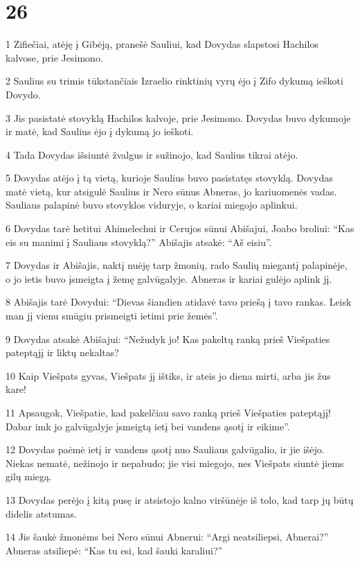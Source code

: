 \chapter{26}

\par 1 Zifiečiai, atėję į Gibėją, pranešė Sauliui, kad Dovydas slapstosi Hachilos kalvose, prie Jesimono. 
\par 2 Saulius su trimis tūkstančiais Izraelio rinktinių vyrų ėjo į Zifo dykumą ieškoti Dovydo. 
\par 3 Jis pasistatė stovyklą Hachilos kalvoje, prie Jesimono. Dovydas buvo dykumoje ir matė, kad Saulius ėjo į dykumą jo ieškoti. 
\par 4 Tada Dovydas išsiuntė žvalgus ir sužinojo, kad Saulius tikrai atėjo. 
\par 5 Dovydas atėjo į tą vietą, kurioje Saulius buvo pasistatęs stovyklą. Dovydas matė vietą, kur atsigulė Saulius ir Nero sūnus Abneras, jo kariuomenės vadas. Sauliaus palapinė buvo stovyklos viduryje, o kariai miegojo aplinkui. 
\par 6 Dovydas tarė hetitui Ahimelechui ir Cerujos sūnui Abišajui, Joabo broliui: “Kas eis su manimi į Sauliaus stovyklą?” Abišajis atsakė: “Aš eisiu”. 
\par 7 Dovydas ir Abišajis, naktį nuėję tarp žmonių, rado Saulių miegantį palapinėje, o jo ietis buvo įsmeigta į žemę galvūgalyje. Abneras ir kariai gulėjo aplink jį. 
\par 8 Abišajis tarė Dovydui: “Dievas šiandien atidavė tavo priešą į tavo rankas. Leisk man jį vienu smūgiu prismeigti ietimi prie žemės”. 
\par 9 Dovydas atsakė Abišajui: “Nežudyk jo! Kas pakeltų ranką prieš Viešpaties pateptąjį ir liktų nekaltas? 
\par 10 Kaip Viešpats gyvas, Viešpats jį ištiks, ir ateis jo diena mirti, arba jis žus kare! 
\par 11 Apsaugok, Viešpatie, kad pakelčiau savo ranką prieš Viešpaties pateptąjį! Dabar imk jo galvūgalyje įsmeigtą ietį bei vandens ąsotį ir eikime”. 
\par 12 Dovydas paėmė ietį ir vandens ąsotį nuo Sauliaus galvūgalio, ir jie išėjo. Niekas nematė, nežinojo ir nepabudo; jie visi miegojo, nes Viešpats siuntė jiems gilų miegą. 
\par 13 Dovydas perėjo į kitą pusę ir atsistojo kalno viršūnėje iš tolo, kad tarp jų būtų didelis atstumas. 
\par 14 Jis šaukė žmonėms bei Nero sūnui Abnerui: “Argi neatsiliepsi, Abnerai?” Abneras atsiliepė: “Kas tu esi, kad šauki karaliui?” 
